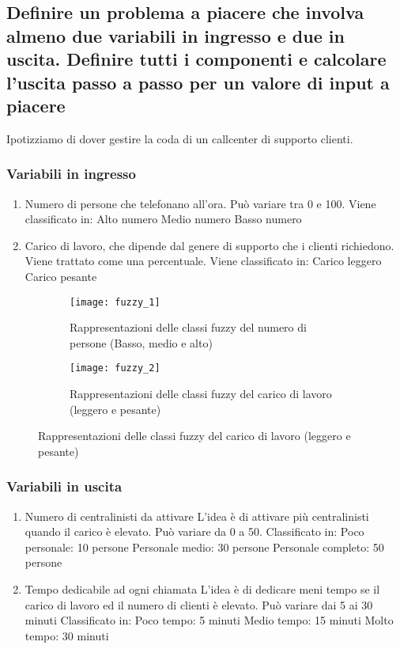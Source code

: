 \documentclass[\main/main.tex]{subfiles}
\begin{document}
\subsection{Definire un problema a piacere che involva almeno due variabili in ingresso e due in uscita. Definire tutti i componenti e calcolare l'uscita passo a passo per un valore di input a piacere}

Ipotizziamo di dover gestire la coda di un callcenter di supporto clienti.
\subsubsection*{Variabili in ingresso}
\begin{enumerate}
  \item Numero di persone che telefonano all'ora.
        \subitem Può variare tra 0 e 100.
        \subitem Viene classificato in:
        \subsubitem Alto numero
        \subsubitem Medio numero
        \subsubitem Basso numero
  \item Carico di lavoro, che dipende dal genere di supporto che i clienti richiedono.
        \subitem Viene trattato come una percentuale.
        \subitem Viene classificato in:
        \subsubitem Carico leggero
        \subsubitem Carico pesante
\end{enumerate}

\begin{figure}
  \begin{subfigure}{0.49\textwidth}
    \texttt{[image: fuzzy\_1]}
    \caption{Rappresentazioni delle classi fuzzy del numero di persone (Basso, medio e alto)}
  \end{subfigure}
  \begin{subfigure}{0.49\textwidth}
    \texttt{[image: fuzzy\_2]}
    \caption{Rappresentazioni delle classi fuzzy del carico di lavoro (leggero e pesante)}
  \end{subfigure}
\end{figure}

\subsubsection*{Variabili in uscita}
\begin{enumerate}
  \item Numero di centralinisti da attivare
        \subitem L'idea è di attivare più centralinisti quando il carico è elevato.
        \subitem Può variare da 0 a 50.
        \subitem Classificato in:
        \subsubitem Poco personale: 10 persone
        \subsubitem Personale medio: 30 persone
        \subsubitem Personale completo: 50 persone
  \item Tempo dedicabile ad ogni chiamata
        \subitem L'idea è di dedicare meni tempo se il carico di lavoro ed il numero di clienti è elevato.
        \subitem Può variare dai 5 ai 30 minuti
        \subitem Classificato in:
        \subsubitem Poco tempo: 5 minuti
        \subsubitem Medio tempo: 15 minuti
        \subsubitem Molto tempo: 30 minuti
\end{enumerate}
\end{document}
